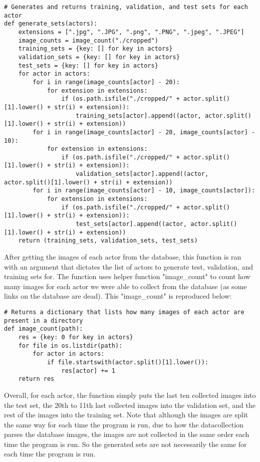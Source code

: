 \documentclass[11pt,a4paper]{report}
\begin{document}
\begin{lstlisting}
# Generates and returns training, validation, and test sets for each actor
def generate_sets(actors):
    extensions = [".jpg", ".JPG", ".png", ".PNG", ".jpeg", ".JPEG"]
    image_counts = image_count("./cropped")
    training_sets = {key: [] for key in actors}
    validation_sets = {key: [] for key in actors}
    test_sets = {key: [] for key in actors}
    for actor in actors:
        for i in range(image_counts[actor] - 20):
            for extension in extensions:
                if (os.path.isfile("./cropped/" + actor.split()[1].lower() + str(i) + extension)):
                    training_sets[actor].append((actor, actor.split()[1].lower() + str(i) + extension))
        for i in range(image_counts[actor] - 20, image_counts[actor] - 10):
            for extension in extensions:
                if (os.path.isfile("./cropped/" + actor.split()[1].lower() + str(i) + extension)):
                    validation_sets[actor].append((actor, actor.split()[1].lower() + str(i) + extension))
        for i in range(image_counts[actor] - 10, image_counts[actor]):
            for extension in extensions:
                if (os.path.isfile("./cropped/" + actor.split()[1].lower() + str(i) + extension)):
                    test_sets[actor].append((actor, actor.split()[1].lower() + str(i) + extension))
    return (training_sets, validation_sets, test_sets)
\end{lstlisting}	

After getting the images of each actor from the database, this function is ran with an argument that dictates the list of actors to generate test, validation, and training sets for. The function uses helper function "image\_count" to count how many images for each actor we were able to collect from the database (as some links on the database are dead). This "image\_count" is reproduced below:

\begin{lstlisting}
# Returns a dictionary that lists how many images of each actor are present in a directory
def image_count(path):
    res = {key: 0 for key in actors}
    for file in os.listdir(path):
        for actor in actors:
            if file.startswith(actor.split()[1].lower()):
                res[actor] += 1
    return res
\end{lstlisting}

Overall, for each actor, the function simply puts the last ten collected images into the test set, the 20th to 11th last collected images into the validation set, and the rest of the images into the training set. Note that although the images are split the same way for each time the program is run, due to how the datacollection parses the database images, the images are not collected in the same order each time the program is run. So the generated sets are not necessarily the same for each time the program is run.
\end{document}
